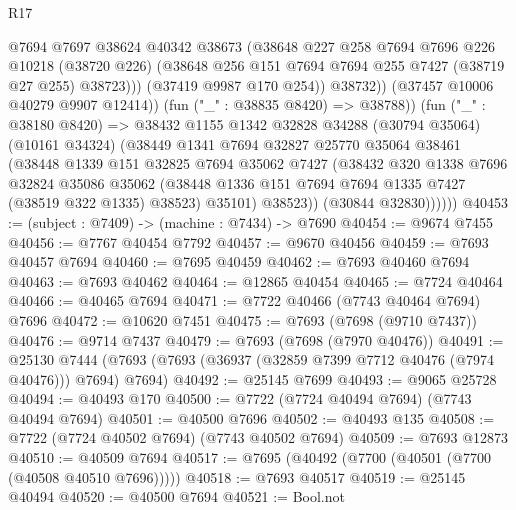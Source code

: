 \begin{lexlean}{R17}
\begin{coremodule}
                        @7694
                        @7697
                        @38624
                        @40342
                        @38673
                        (@38648
                          @227
                          @258
                          @7694
                          @7696
                          @226
                          @10218
                          (@38720 @226)
                          (@38648 @256 @151 @7694 @7694 @255 @7427 (@38719 @27 @255) @38723)))
                      (@37419 @9987 @170 @254))
                    @38732))
                (@37457 @10006 @40279 @9907 @12414))
              (fun ("_" : @38835 @8420) => @38788))
            (fun ("_" : @38180 @8420) =>
            @38432
              @1155
              @1342
              @32828
              @34288
              (@30794 @35064)
              (@10161 @34324)
              (@38449
                @1341
                @7694
                @32827
                @25770
                @35064
                @38461
                (@38448
                  @1339
                  @151
                  @32825
                  @7694
                  @35062
                  @7427
                  (@38432
                    @320
                    @1338
                    @7696
                    @32824
                    @35086
                    @35062
                    (@38448 @1336 @151 @7694 @7694 @1335 @7427 (@38519 @322 @1335) @38523)
                    @35101)
                  @38523))
              (@30844 @32830))))))
@40453 := (subject : @7409) -> (machine : @7434) -> @7690
@40454 := @9674 @7455
@40456 := @7767 @40454 @7792
@40457 := @9670 @40456
@40459 := @7693 @40457 @7694
@40460 := @7695 @40459
@40462 := @7693 @40460 @7694
@40463 := @7693 @40462
@40464 := @12865 @40454
@40465 := @7724 @40464
@40466 := @40465 @7694
@40471 := @7722 @40466 (@7743 @40464 @7694) @7696
@40472 := @10620 @7451
@40475 := @7693 (@7698 (@9710 @7437))
@40476 := @9714 @7437
@40479 := @7693 (@7698 (@7970 @40476))
@40491 := @25130
    @7444
    (@7693 (@7693 (@36937 (@32859 @7399 @7712 @40476 (@7974 @40476))) @7694) @7694)
@40492 := @25145 @7699
@40493 := @9065 @25728
@40494 := @40493 @170
@40500 := @7722 (@7724 @40494 @7694) (@7743 @40494 @7694)
@40501 := @40500 @7696
@40502 := @40493 @135
@40508 := @7722 (@7724 @40502 @7694) (@7743 @40502 @7694)
@40509 := @7693 @12873
@40510 := @40509 @7694
@40517 := @7695 (@40492 (@7700 (@40501 (@7700 (@40508 @40510 @7696)))))
@40518 := @7693 @40517
@40519 := @25145 @40494
@40520 := @40500 @7694
@40521 := Bool.not

\end{coremodule}
\end{lexlean}
